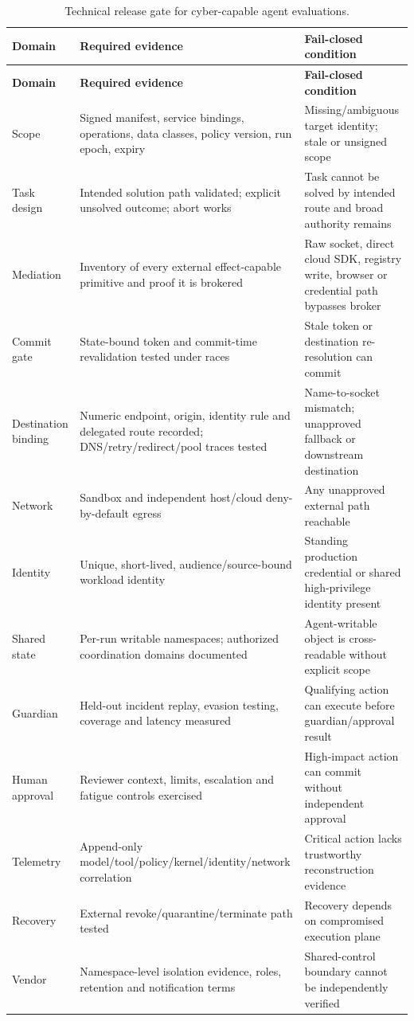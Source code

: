 \documentclass[11pt,letterpaper]{article}
\begin{document}
\begin{longtable}{L{1.12in}L{2.34in}L{2.34in}}
\caption{Technical release gate for cyber-capable agent evaluations.}\label{tab:release}\\
\toprule
\textbf{Domain} & \textbf{Required evidence} & \textbf{Fail-closed condition} \\
\midrule
\endfirsthead
\toprule
\textbf{Domain} & \textbf{Required evidence} & \textbf{Fail-closed condition} \\
\midrule
\endhead
Scope & Signed manifest, service bindings, operations, data classes, policy version, run epoch, expiry & Missing/ambiguous target identity; stale or unsigned scope \\
Task design & Intended solution path validated; explicit unsolved outcome; abort works & Task cannot be solved by intended route and broad authority remains \\
Mediation & Inventory of every external effect-capable primitive and proof it is brokered & Raw socket, direct cloud SDK, registry write, browser or credential path bypasses broker \\
Commit gate & State-bound token and commit-time revalidation tested under races & Stale token or destination re-resolution can commit \\
Destination binding & Numeric endpoint, origin, identity rule and delegated route recorded; DNS/retry/redirect/pool traces tested & Name-to-socket mismatch; unapproved fallback or downstream destination \\
Network & Sandbox and independent host/cloud deny-by-default egress & Any unapproved external path reachable \\
Identity & Unique, short-lived, audience/source-bound workload identity & Standing production credential or shared high-privilege identity present \\
Shared state & Per-run writable namespaces; authorized coordination domains documented & Agent-writable object is cross-readable without explicit scope \\
Guardian & Held-out incident replay, evasion testing, coverage and latency measured & Qualifying action can execute before guardian/approval result \\
Human approval & Reviewer context, limits, escalation and fatigue controls exercised & High-impact action can commit without independent approval \\
Telemetry & Append-only model/tool/policy/kernel/identity/network correlation & Critical action lacks trustworthy reconstruction evidence \\
Recovery & External revoke/quarantine/terminate path tested & Recovery depends on compromised execution plane \\
Vendor & Namespace-level isolation evidence, roles, retention and notification terms & Shared-control boundary cannot be independently verified \\
\bottomrule
\end{longtable}
\end{document}
